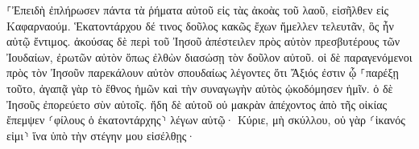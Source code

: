\documentclass{openreader}
\begin{document}
⸀Ἐπειδὴ ἐπλήρωσεν πάντα τὰ ῥήματα αὐτοῦ εἰς τὰς ἀκοὰς τοῦ λαοῦ, εἰσῆλθεν εἰς Καφαρναούμ. 
Ἑκατοντάρχου δέ τινος δοῦλος κακῶς ἔχων ἤμελλεν τελευτᾶν, ὃς ἦν αὐτῷ ἔντιμος. 
ἀκούσας δὲ περὶ τοῦ Ἰησοῦ ἀπέστειλεν πρὸς αὐτὸν πρεσβυτέρους τῶν Ἰουδαίων, ἐρωτῶν αὐτὸν ὅπως ἐλθὼν διασώσῃ τὸν δοῦλον αὐτοῦ. 
οἱ δὲ παραγενόμενοι πρὸς τὸν Ἰησοῦν παρεκάλουν αὐτὸν σπουδαίως λέγοντες ὅτι Ἄξιός ἐστιν ᾧ ⸀παρέξῃ τοῦτο, 
ἀγαπᾷ γὰρ τὸ ἔθνος ἡμῶν καὶ τὴν συναγωγὴν αὐτὸς ᾠκοδόμησεν ἡμῖν. 
ὁ δὲ Ἰησοῦς ἐπορεύετο σὺν αὐτοῖς. ἤδη δὲ αὐτοῦ οὐ μακρὰν ἀπέχοντος ἀπὸ τῆς οἰκίας ἔπεμψεν ⸂φίλους ὁ ἑκατοντάρχης⸃ λέγων αὐτῷ· Κύριε, μὴ σκύλλου, οὐ γὰρ ⸂ἱκανός εἰμι⸃ ἵνα ὑπὸ τὴν στέγην μου εἰσέλθῃς· 
\end{document}
